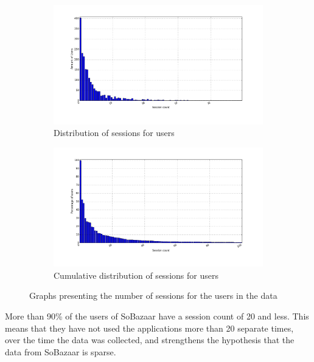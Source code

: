     \begin{figure}[H]
        \centering
        \begin{subfigure}{.5\textwidth}
            \centering
            \includegraphics[width=\dualGraphWidth]{image/sessionsCountdistribution.png}
            \caption{Distribution of sessions for users}
    \label{figure:sessCountDist}
        \end{subfigure}%
        \begin{subfigure}{.5\textwidth}
            \centering
            \includegraphics[width=\dualGraphWidth]{image/sessioncumdistribution.png}
            \caption{Cumulative distribution of sessions for users}
    \label{figure:sessCountCumDist}
        \end{subfigure}
        \caption{Graphs presenting the number of sessions for the users in the data}
    \end{figure}
        More than 90\% of the users of SoBazaar have a session count of 20 and less.
        This means that they have not used the applications more than 20 separate times, over the time the data was collected, and strengthens the hypothesis that the data from SoBazaar is sparse.

